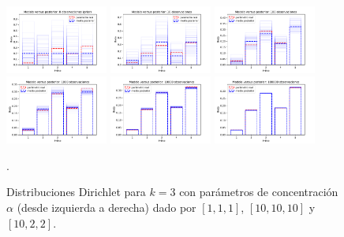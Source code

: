 \begin{example}
\begin{figure}[h]
\centering
\includegraphics[width=0.3\textwidth]{img/post_dirichlet_0.pdf}
\includegraphics[width=0.3\textwidth]{img/post_dirichlet_10.pdf}
\includegraphics[width=0.3\textwidth]{img/post_dirichlet_100.pdf}\\
\includegraphics[width=0.3\textwidth]{img/post_dirichlet_1000.pdf}
\includegraphics[width=0.3\textwidth]{img/post_dirichlet_10000.pdf}
\includegraphics[width=0.3\textwidth]{img/post_dirichlet_100000.pdf}
\caption{Distribuciones Dirichlet para $k=3$ con parámetros de concentración $\alpha$ (desde izquierda a derecha) dado por $[1,1,1]$, $[10,10,10]$ y $[10,2,2]$. }.
\label{fig:post_Dirichlet}

\end{figure}


\end{example}

